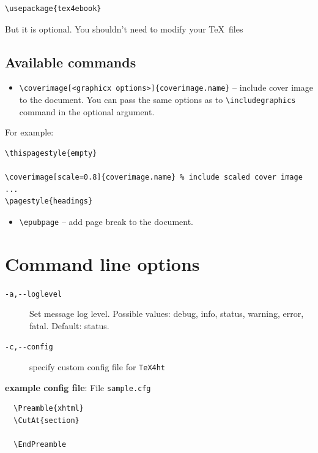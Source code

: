 \begin{verbatim}
\usepackage{tex4ebook}
\end{verbatim}

But it is optional. You shouldn't need to modify your \TeX~files

\hypertarget{available-commands}{%
\subsection{Available commands}\label{available-commands}}

\begin{itemize}
\tightlist
\item
  \texttt{\textbackslash{}coverimage{[}\textless{}graphicx\ options\textgreater{}{]}\{coverimage.name\}}
  -- include cover image to the document. You can pass the same options
  as to \texttt{\textbackslash{}includegraphics} command in the optional
  argument.
\end{itemize}

For example:

\begin{verbatim}
\thispagestyle{empty}

\coverimage[scale=0.8]{coverimage.name} % include scaled cover image
...
\pagestyle{headings}
\end{verbatim}

\begin{itemize}
\tightlist
\item
  \texttt{\textbackslash{}epubpage} -- add page break to the document.
\end{itemize}

\hypertarget{command-line-options}{%
\section{Command line options}\label{command-line-options}}

\begin{description}
\item[\texttt{-a,-\/-loglevel}]
Set message log level. Possible values: debug, info, status, warning,
error, fatal. Default: status.
\item[\texttt{-c,-\/-config}]
specify custom config file for \texttt{TeX4ht}
\end{description}

\textbf{example config file}: File \texttt{sample.cfg}

\begin{verbatim}
  \Preamble{xhtml}
  \CutAt{section}
  
  \EndPreamble
\end{verbatim}


